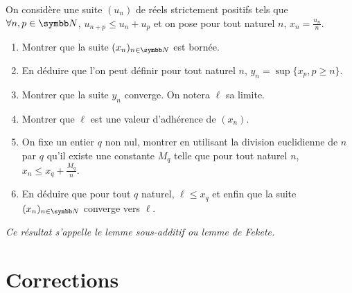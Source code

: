 \begin{exercice}
    On considère une suite $(u_{n})$ de réels strictement positifs tels que $\forall n,p\in\N$, $u_{n+p}\leqslant u_{n}+u_{p}$ 
    et on pose pour tout naturel $n$, $x_{n}=\frac{u_{n}}{n}$.
    \begin{enumerate}
        \item Montrer que la suite $(x_{n})_{n\in\N}$ est bornée.
        \item En déduire que l'on peut définir pour tout naturel $n$, $y_{n}=\sup\{x_{p}, p\geqslant n\}$.
        \item Montrer que la suite $y_{n}$ converge. On notera $\ell$ sa limite.
        \item Montrer que $\ell$ est une valeur d'adhérence de $(x_{n})$.
        \item On fixe un entier $q$ non nul, montrer en utilisant la division euclidienne de $n$ par $q$ qu'il existe une constante $M_{q}$ 
            telle que pour tout naturel $n$, $x_{n}\leqslant x_{q}+\frac{M_{q}}{n}$.
        \item En déduire que pour tout $q$ naturel, $\ell\leqslant x_{q}$ et enfin que la suite $(x_{n})_{n\in\N}$ converge vers $\ell$.
    \end{enumerate}
    \textit{Ce résultat s'appelle le lemme sous-additif ou lemme de Fekete.}
\end{exercice}

\newpage
\section{Corrections}

